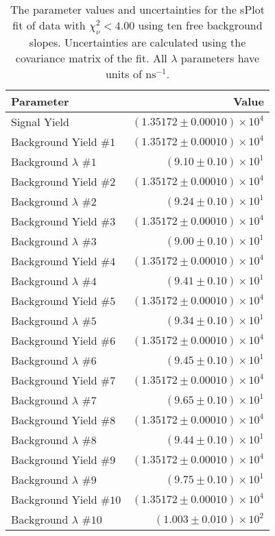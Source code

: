 
\begin{table}[ht]
    \begin{center}
        \begin{tabular}{lr}\toprule
            Parameter & Value \\\midrule
            Signal Yield & $(1.35172 \pm 0.00010) \times 10^{4}$ \\
            Background Yield $\#1$ & $(1.35172 \pm 0.00010) \times 10^{4}$ \\
            Background $\lambda$ $\#1$ & $(9.10 \pm 0.10) \times 10^{1}$ \\
            Background Yield $\#2$ & $(1.35172 \pm 0.00010) \times 10^{4}$ \\
            Background $\lambda$ $\#2$ & $(9.24 \pm 0.10) \times 10^{1}$ \\
            Background Yield $\#3$ & $(1.35172 \pm 0.00010) \times 10^{4}$ \\
            Background $\lambda$ $\#3$ & $(9.00 \pm 0.10) \times 10^{1}$ \\
            Background Yield $\#4$ & $(1.35172 \pm 0.00010) \times 10^{4}$ \\
            Background $\lambda$ $\#4$ & $(9.41 \pm 0.10) \times 10^{1}$ \\
            Background Yield $\#5$ & $(1.35172 \pm 0.00010) \times 10^{4}$ \\
            Background $\lambda$ $\#5$ & $(9.34 \pm 0.10) \times 10^{1}$ \\
            Background Yield $\#6$ & $(1.35172 \pm 0.00010) \times 10^{4}$ \\
            Background $\lambda$ $\#6$ & $(9.45 \pm 0.10) \times 10^{1}$ \\
            Background Yield $\#7$ & $(1.35172 \pm 0.00010) \times 10^{4}$ \\
            Background $\lambda$ $\#7$ & $(9.65 \pm 0.10) \times 10^{1}$ \\
            Background Yield $\#8$ & $(1.35172 \pm 0.00010) \times 10^{4}$ \\
            Background $\lambda$ $\#8$ & $(9.44 \pm 0.10) \times 10^{1}$ \\
            Background Yield $\#9$ & $(1.35172 \pm 0.00010) \times 10^{4}$ \\
            Background $\lambda$ $\#9$ & $(9.75 \pm 0.10) \times 10^{1}$ \\
            Background Yield $\#10$ & $(1.35172 \pm 0.00010) \times 10^{4}$ \\
            Background $\lambda$ $\#10$ & $(1.003 \pm 0.010) \times 10^{2}$ \\\bottomrule
        \end{tabular}
        \caption{The parameter values and uncertainties for the sPlot fit of data with $\chi^2_\nu < 4.00$ using ten free background slopes. Uncertainties are calculated using the covariance matrix of the fit. All $\lambda$ parameters have units of $\si{\nano\second}^{-1}$.}\label{tab:splot-fit-results-chisqdof-4.00-free-10}
    \end{center}
\end{table}
